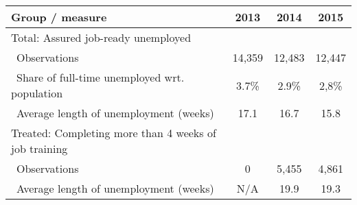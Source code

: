 \begin{tabular}{lccc}
\toprule
Group / measure & 2013  & 2014  & 2015    \\
\midrule
Total: Assured job-ready unemployed & & & \\
\ Observations  & 14,359& 12,483& 12,447  \\
\ Share of full-time unemployed wrt. population
                & 3.7\% & 2.9\% & 2,8\%   \\
\ Average length of unemployment (weeks)
                & 17.1  & 16.7  & 15.8    \\
\midrule
Treated: Completing more than 4 weeks of job training & & & \\
\ Observations  & 0     & 5,455 & 4,861   \\
\ Average length of unemployment (weeks)
                & N/A   & 19.9  & 19.3    \\
\bottomrule
\end{tabular}
%
%
%     
